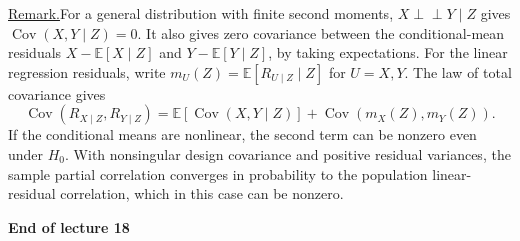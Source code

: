 \documentclass[11pt,a4paper]{article}
\begin{document}
\medskip
\noindent\underline{Remark.}\quad For a general distribution with finite
second moments, $X\perp\!\!\!\perp Y\mid Z$ gives
$\operatorname{Cov}(X,Y\mid Z)=0$. It also gives zero covariance between
the conditional-mean residuals $X-\mathbb E[X\mid Z]$ and
$Y-\mathbb E[Y\mid Z]$, by taking expectations. For the linear regression
residuals, write $m_U(Z)=\mathbb E[R_{U\mid Z}\mid Z]$ for $U=X,Y$.
The law of total covariance gives
\[
\operatorname{Cov}(R_{X\mid Z},R_{Y\mid Z})
=\mathbb E[\operatorname{Cov}(X,Y\mid Z)]
 +\operatorname{Cov}(m_X(Z),m_Y(Z)).
\]
If the conditional means are nonlinear, the second term can be nonzero
even under $H_0$. With nonsingular design covariance and positive
residual variances, the sample partial correlation converges in
probability to the population linear-residual correlation, which in
this case can be nonzero.

\begin{center}
\textbf{End of lecture 18}
\end{center}
\end{document}
